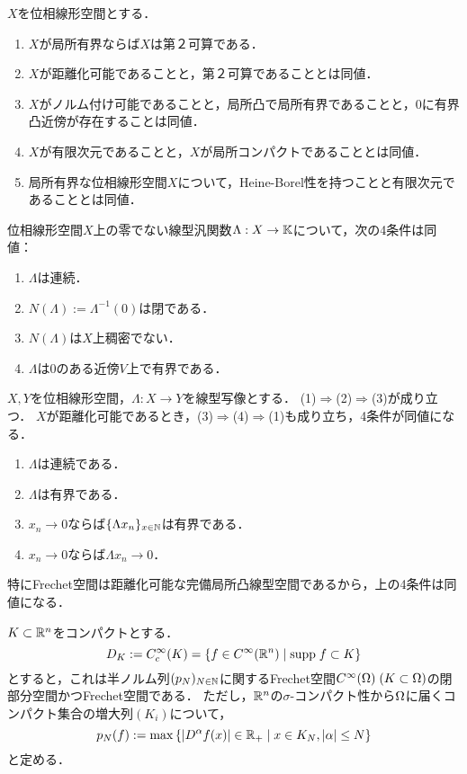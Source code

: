 \documentclass[uplatex,dvipdfmx]{jsreport}
\begin{document}
\begin{theorem}\label{thm-character-of-TVS}
    $X$を位相線形空間とする．
    \begin{enumerate}
        \item $X$が局所有界ならば$X$は第２可算である．
        \item $X$が距離化可能であることと，第２可算であることとは同値．
        \item $X$がノルム付け可能であることと，局所凸で局所有界であることと，$0$に有界凸近傍が存在することは同値．
        \item $X$が有限次元であることと，$X$が局所コンパクトであることとは同値．
        \item 局所有界な位相線形空間$X$について，Heine-Borel性を持つことと有限次元であることとは同値．
    \end{enumerate}
\end{theorem}

\begin{theorem}
    位相線形空間$X$上の零でない線型汎関数$\Lambda:X\to\mathbb{K}$について，次の4条件は同値：
    \begin{enumerate}
        \item $\Lambda$は連続．
        \item $N(\Lambda):=\Lambda^{-1}(0)$は閉である．
        \item $N(\Lambda)$は$X$上稠密でない．
        \item $\Lambda$は$0$のある近傍$V$上で有界である．
    \end{enumerate}
\end{theorem}

\begin{theorem}
    $X,Y$を位相線形空間，$\Lambda:X\to Y$を線型写像とする．
    (1)$\Rightarrow$(2)$\Rightarrow$(3)が成り立つ．
    $X$が距離化可能であるとき，(3)$\Rightarrow$(4)$\Rightarrow$(1)も成り立ち，4条件が同値になる．
    \begin{enumerate}
        \item $\Lambda$は連続である．
        \item $\Lambda$は有界である．
        \item $x_n\to 0$ならば$\{\Lambda x_n\}_{x\in\mathbb{N}}$は有界である．
        \item $x_n\to0$ならば$\Lambda x_n\to0$．
    \end{enumerate}
    特にFrechet空間は距離化可能な完備局所凸線型空間であるから，上の4条件は同値になる．
\end{theorem}

\begin{example}[滑らかな関数のFrechet空間とその部分Frechet空間]
    $K\subset\mathbb{R}^n$をコンパクトとする．
    \[D_K:=C_c^\infty(K)=\left\{f\in C^\infty(\mathbb{R}^n)\mid \mathrm{supp}\; f\subset K\right\}\]
    とすると，これは半ノルム列$(p_N)_{N\in\mathbb{N}}$に関するFrechet空間$C^\infty(\Omega)\;(K\subset\Omega)$の閉部分空間かつFrechet空間である．
    ただし，$\mathbb{R}^n$の$\sigma$-コンパクト性から$\Omega$に届くコンパクト集合の増大列$(K_i)$について，
    \[p_N(f):=\max\left\{\lvert D^\alpha f(x)\rvert\in\mathbb{R}_+\mid x\in K_N,\lvert\alpha\rvert\le N\right\}\]
    と定める．
\end{example}
\end{document}
